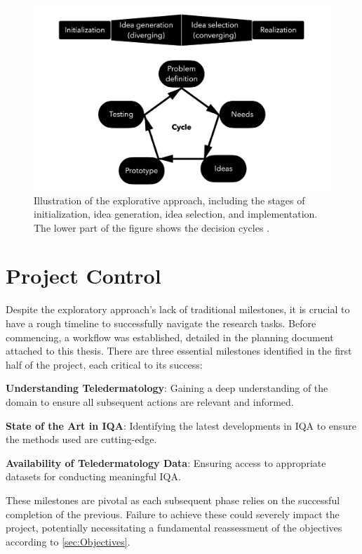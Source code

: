 \begin{figure}[ht]
    \centering
    \includegraphics[keepaspectratio,width=15cm]{img/DecisionCycle.jpg}
    \caption{Illustration of the explorative approach, including the stages of initialization, idea generation, idea selection, and implementation. The lower part of the figure shows the decision cycles \autocite{DesignThinking}.}
    \label{fig:decision_cycle}
\end{figure}

\section{Project Control}
\label{sec:ProjectMonitoring}
Despite the exploratory approach's lack of traditional milestones, it is crucial to have a rough timeline to successfully navigate the research tasks. Before commencing, a workflow was established, detailed in the planning document attached to this thesis. There are three essential milestones identified in the first half of the project, each critical to its success: \par
\vspace{\baselineskip}
\noindent
\textbf{Understanding Teledermatology}: Gaining a deep understanding of the domain to ensure all subsequent actions are relevant and informed. \par
\noindent
\textbf{State of the Art in IQA}: Identifying the latest developments in IQA to ensure the methods used are cutting-edge. \par
\noindent
\textbf{Availability of Teledermatology Data}:  Ensuring access to appropriate datasets for conducting meaningful IQA. \par
\vspace{\baselineskip}
\noindent
These milestones are pivotal as each subsequent phase relies on the successful completion of the previous. Failure to achieve these could severely impact the project, potentially necessitating a fundamental reassessment of the objectives according to \autoref{sec:Objectives}. \par

